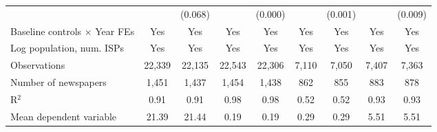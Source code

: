 {\begin{tabular}{l*{8}{c}}
                    &                     &     (0.068)         &                     &     (0.000)         &                     &     (0.001)         &                     &     (0.009)         \\
\addlinespace
Baseline controls $\times$ Year FEs &         Yes         &         Yes         &         Yes         &         Yes         &         Yes         &         Yes         &         Yes         &         Yes         \\
\addlinespace
Log population, num. ISPs &         Yes         &         Yes         &         Yes         &         Yes         &         Yes         &         Yes         &         Yes         &         Yes         \\
\midrule
Observations        &      22,339         &      22,135         &      22,543         &      22,306         &       7,110         &       7,050         &       7,407         &       7,363         \\
Number of newspapers&       1,451         &       1,437         &       1,454         &       1,438         &         862         &         855         &         883         &         878         \\
R$^2$               &        0.91         &        0.91         &        0.98         &        0.98         &        0.52         &        0.52         &        0.93         &        0.93         \\
Mean dependent variable&       21.39         &       21.44         &        0.19         &        0.19         &        0.29         &        0.29         &        5.51         &        5.51         \\
\bottomrule
\end{tabular}
}

